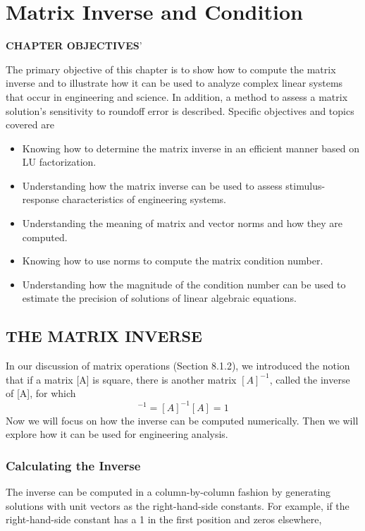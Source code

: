 \documentclass[../main.tex]{subfiles}
\begin{document}
\theoremstyle{definition}

\chapter{Matrix Inverse and Condition}

\begin{center}
\textbf{CHAPTER OBJECTIVES}'
\end{center}
The primary objective of this chapter is to show how to compute the matrix inverse
and to illustrate how it can be used to analyze complex linear systems that occur in
engineering and science. In addition, a method to assess a matrix solution's sensitivity
to roundoff error is described. Specific objectives and topics covered are
\begin{itemize}
	\item Knowing how to determine the matrix inverse in an efficient manner based on LU
factorization.
	\item Understanding how the matrix inverse can be used to assess stimulus-response
characteristics of engineering systems.
	\item Understanding the meaning of matrix and vector norms and how they are computed.
	\item Knowing how to use norms to compute the matrix condition number.
	\item Understanding how the magnitude of the condition number can be used to
estimate the precision of solutions of linear algebraic equations.
\end{itemize}



\section{THE MATRIX INVERSE}

In our discussion of matrix operations (Section 8.1.2), we introduced the notion that if a matrix [A] is square, there is another matrix $[A]^{-1}$, called the inverse of [A], for which
\begin{equation}
[A][A]^{-1}=[A]^{-1}[A]=1
\tag{11.1}
\end{equation}
Now we will focus on how the inverse can be computed numerically. Then we will explore how it can be used for engineering analysis.

\subsection{Calculating the Inverse}
The inverse can be computed in a column-by-column fashion by generating solutions with unit vectors as the right-hand-side constants. For example, if the right-hand-side constant has a 1 in the first position and zeros elsewhere,
\end{document}
